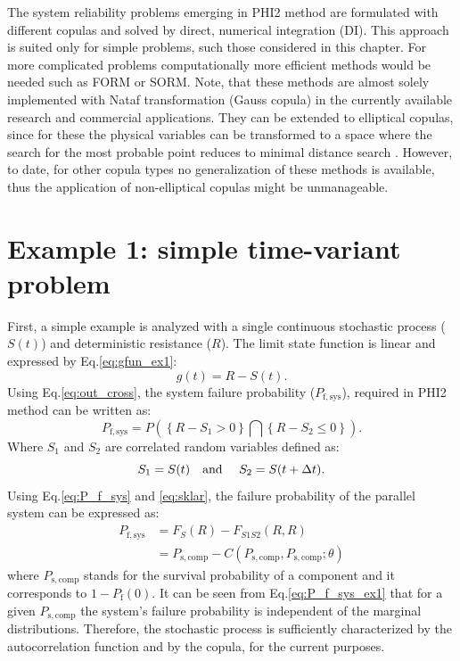 The system reliability problems emerging in PHI2 method are formulated with different copulas and solved by direct, numerical integration (DI). This approach is suited only for simple problems, such those considered in this chapter. For more complicated problems computationally more efficient methods would be needed such as FORM or SORM. Note, that these methods are almost solely implemented with Nataf transformation (Gauss copula) in the currently available research and commercial applications. They can be extended to elliptical copulas, since for these the physical variables can be transformed to a space where the search for the most probable point reduces to minimal distance search \citep{Lebrun2009}. However, to date, for other copula types no generalization of these methods is available, thus the application of non-elliptical copulas might be unmanageable.

\section{Example 1: simple time-variant problem}

First, a simple example is analyzed with a single continuous stochastic process ($S(t)$) and deterministic resistance ($R$). The limit state function is linear and expressed by Eq.\ref{eq:gfun_ex1}:
\begin{equation}
\label{eq:gfun_ex1}
	g(t) = R - S(t). 
\end{equation}
Using Eq.\ref{eq:out_cross}, the system failure probability ($P_\mathrm{f,sys}$), required in PHI2 method can be written as:
\begin{equation}
\label{eq:P_f_sys}
	{P_{{\mathrm{f,sys}}}} = {{P}}\left( {\left\{ {R - {S_1} > 0} \right\}\bigcap {\left\{ {R - {S_2} \le 0} \right\}} } \right).
\end{equation}
Where $S_1$ and $S_2$ are correlated random variables defined as:
\begin{equation}
\label{eq:S_def}
	{S_1} = S(t) \text{\quad and \quad} {S_2} = S(t + \Delta t). 
\end{equation}
Using Eq.\ref{eq:P_f_sys} and \ref{eq:sklar}, the failure probability of the parallel system can be expressed as:
\begin{equation}
\label{eq:P_f_sys_ex1}
	\begin{aligned}
		{P_{{\mathrm{f,sys}}}} &= {F_S}\left( R \right) - {F_{S1S2}}\left( {R,R} \right)\\
		 & = {P_{{\mathrm{s,comp}}}} - C\left( {{P_{{\mathrm{s,comp}}}},{P_{{\mathrm{s,comp}}}};\theta } \right)
	\end{aligned}
\end{equation}
where $P_\mathrm{s,comp}$ stands for the survival probability of a component and it corresponds to $1-P_\mathrm{f}(0)$. It can be seen from Eq.\ref{eq:P_f_sys_ex1} that for a given $P_\mathrm{s,comp}$ the system's failure probability is independent of the marginal distributions. Therefore, the stochastic process is sufficiently characterized by the autocorrelation function and by the copula, for the current purposes.

